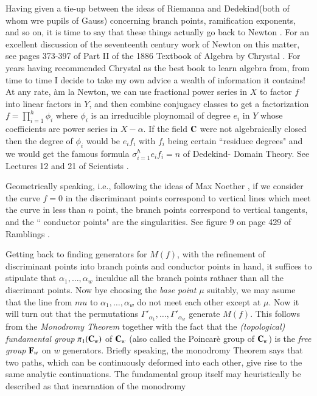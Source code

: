 Having given a tie-up between the ideas of Riemanna and Dedekind\break (both of whom wre pupils of Gauss) concerning branch points, ramification exponents, and so on, it is time to say that these things actually go back to Newton \cite{art1-key47}. For an excellent discussion of the seventeenth century work of Newton on this matter, see pages 373-397 of Part II of the 1886 Textbook of Algebra by Chrystal \cite{art1-key27}. For years having recommended Chrystal as the best book to learn algebra from, from time to time I decide to take my own advice a wealth of information it contains! At any rate, \`am la Newton, we can use fractional power series in $X$ to factor $f$ into linear factors in $Y$, and then combine conjugacy classes to get a factorization $f= \prod^{h}_{i=1} \phi_{i}$ where $\phi_{i}$ is an irreducible ploynomail of degree $e_{i}$ in $Y$ whose coefficients are power series in $X-\alpha$. If the field $\mathbf{C}$ were not algebraically closed then the degree of $\phi_{i}$ would be $e_{i}f_{i}$ with $f_{i}$ being certain ``residuce degrees" and we would get the famous formula $\sigma^{h}_{i=1} e_{i}f_{i}=n$ of Dedekind- Domain Theory. See Lectures 12 and 21 of Scientists \cite{art1-key6}.

Geometrically speaking, i.e., following the ideas of Max Noether \cite{art1-key48}, if we consider the curve $f=0$ in the discriminant points correspond to vertical lines which meet the curve in less than $n$ point, the branch points correspond to vertical tangents, and the `` conductor points" are the singularities. See figure 9 on page 429 of Ramblings \cite{art1-key5}.

 Getting back to finding generators for $M(f)$, with the refinement of discriminant points into branch points and conductor points in hand, it suffices to stipulate that $\alpha_{1}, \ldots, \alpha_{w}$ inculdue all the branch points rathaer than all the discrimant points. Now bye choosing the \textit{base point} $\mu$ suitably, we may asume that the line from $mu$ to $\alpha_{1}, \ldots, \alpha_{w}$ do not meet each other except at $\mu$.  Now it will turn out that the permutations $\Gamma'_{\alpha_{1}}, \ldots, \Gamma'_{\alpha_{w}}$ generate $M(f)$. This follows from the
\textit{Monodromy Theorem} together with the fact that the \textit{(topological) fundamental group} $\pi_{1}(\mathbf{C}_{w})$ of $\mathbf{C}_{w}$ (also called the Poincar\`e group of $\mathbf{C}_{w}$) is the \textit{free group} $\mathbf{F}_{w}$ on $w$ generators. Briefly speaking, the monodromy Theorem says that two paths, which can be continuously deformed into each other, give rise to the same analytic continuations. The fundamental group itself may heuristically be described as that incarnation of the monodromy

